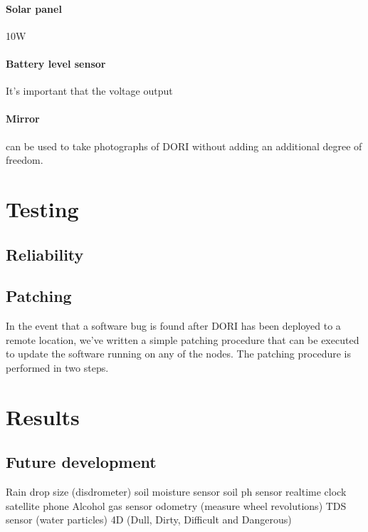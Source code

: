 \documentclass[12pt]{article}
\begin{document}
    \paragraph*{Solar panel}
    10W

    \paragraph*{Battery level sensor}
    It's important that the voltage output 

    \paragraph*{Mirror}
can be used to take photographs of DORI without adding an additional degree of freedom.

\section{Testing}
\subsection{Reliability}
\subsection{Patching}
In the event that a software bug is found after DORI has been deployed to a remote location, we've written a simple patching procedure that can be executed to update the software running on any of the nodes. 
The patching procedure is performed in two steps.

\section{Results}
\subsection{Future development}
Rain drop size (disdrometer)
soil moisture sensor
soil ph sensor
realtime clock
satellite phone
Alcohol gas sensor
odometry (measure wheel revolutions)
TDS sensor (water particles)
4D (Dull, Dirty, Difficult and Dangerous) \cite{atmega2012}
\end{document}
